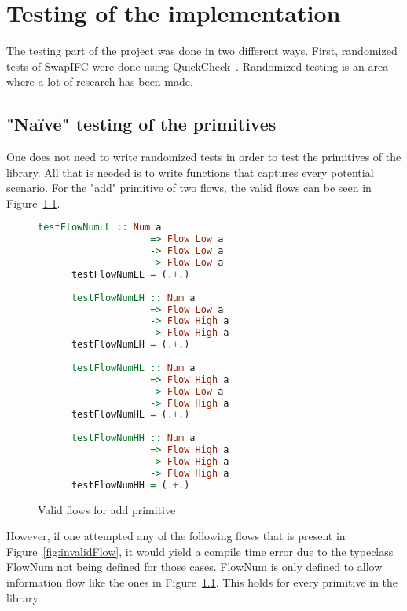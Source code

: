 \chapter{Testing of the implementation}
\label{chapter:testing}
The testing part of the project was done in two different ways. First, randomized tests of SwapIFC were done using QuickCheck~\cite{quickcheck, quickcheck-wiki}. Randomized testing is an area where a lot of research has been made.
\section{"Naïve" testing of the primitives}
One does not need to write randomized tests in order to test the primitives of the library. All that is needed is to write functions that captures every potential scenario. For the "add" primitive of two flows, the valid flows can be seen in Figure~\ref{fig:validFlow}.
\begin{figure}[h]
  \begin{center}
    \begin{lstlisting}[language=Haskell]
      testFlowNumLL :: Num a
                    => Flow Low a
                    -> Flow Low a
                    -> Flow Low a
      testFlowNumLL = (.+.)
    
      testFlowNumLH :: Num a
                    => Flow Low a
                    -> Flow High a
                    -> Flow High a
      testFlowNumLH = (.+.)
    
      testFlowNumHL :: Num a
                    => Flow High a
                    -> Flow Low a
                    -> Flow High a
      testFlowNumHL = (.+.)
    
      testFlowNumHH :: Num a
                    => Flow High a
                    -> Flow High a
                    -> Flow High a
      testFlowNumHH = (.+.)
    \end{lstlisting}
  \end{center}
  \caption{Valid flows for add primitive}
  \label{fig:validFlow}
\end{figure}
However, if one attempted any of the following flows that is present in Figure~\ref{fig:invalidFlow}, it would yield a compile time error due to the typeclass FlowNum not being defined for those cases. FlowNum is only defined to allow information flow like the ones in Figure~\ref{fig:validFlow}. This holds for every primitive in the library.
